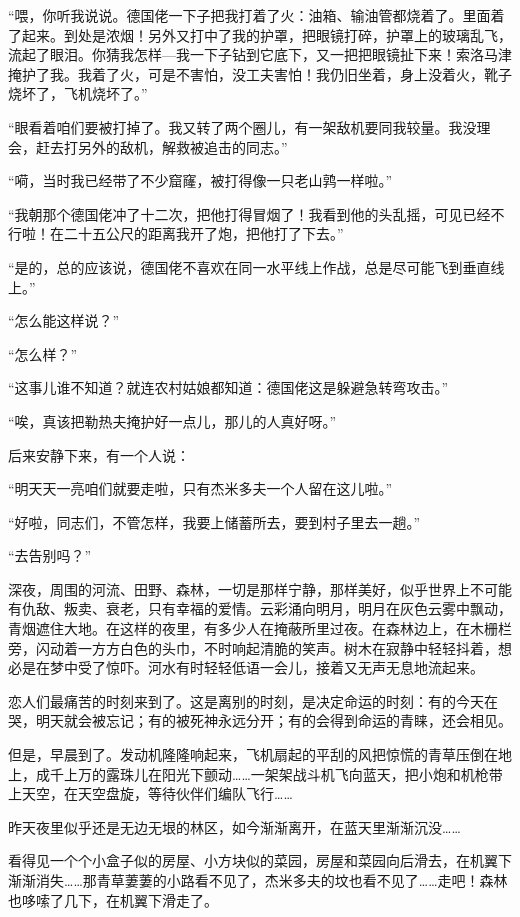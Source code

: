 “喂，你听我说说。德国佬一下子把我打着了火：油箱、输油管都烧着了。里面着了起来。到处是浓烟！另外又打中了我的护罩，把眼镜打碎，护罩上的玻璃乱飞，流起了眼泪。你猜我怎样—我一下子钻到它底下，又一把把眼镜扯下来！索洛马津掩护了我。我着了火，可是不害怕，没工夫害怕！我仍旧坐着，身上没着火，靴子烧坏了，飞机烧坏了。”

“眼看着咱们要被打掉了。我又转了两个圈儿，有一架敌机要同我较量。我没理会，赶去打另外的敌机，解救被追击的同志。”

“嗬，当时我已经带了不少窟窿，被打得像一只老山鹑一样啦。”

“我朝那个德国佬冲了十二次，把他打得冒烟了！我看到他的头乱摇，可见已经不行啦！在二十五公尺的距离我开了炮，把他打了下去。”

“是的，总的应该说，德国佬不喜欢在同一水平线上作战，总是尽可能飞到垂直线上。”

“怎么能这样说？”

“怎么样？”

“这事儿谁不知道？就连农村姑娘都知道：德国佬这是躲避急转弯攻击。”

“唉，真该把勒热夫掩护好一点儿，那儿的人真好呀。”

后来安静下来，有一个人说：

“明天天一亮咱们就要走啦，只有杰米多夫一个人留在这儿啦。”

“好啦，同志们，不管怎样，我要上储蓄所去，要到村子里去一趟。”

“去告别吗？”

深夜，周围的河流、田野、森林，一切是那样宁静，那样美好，似乎世界上不可能有仇敌、叛卖、衰老，只有幸福的爱情。云彩涌向明月，明月在灰色云雾中飘动，青烟遮住大地。在这样的夜里，有多少人在掩蔽所里过夜。在森林边上，在木栅栏旁，闪动着一方方白色的头巾，不时响起清脆的笑声。树木在寂静中轻轻抖着，想必是在梦中受了惊吓。河水有时轻轻低语一会儿，接着又无声无息地流起来。

恋人们最痛苦的时刻来到了。这是离别的时刻，是决定命运的时刻：有的今天在哭，明天就会被忘记；有的被死神永远分开；有的会得到命运的青睐，还会相见。

但是，早晨到了。发动机隆隆响起来，飞机扇起的平刮的风把惊慌的青草压倒在地上，成千上万的露珠儿在阳光下颤动……一架架战斗机飞向蓝天，把小炮和机枪带上天空，在天空盘旋，等待伙伴们编队飞行……

昨天夜里似乎还是无边无垠的林区，如今渐渐离开，在蓝天里渐渐沉没……

看得见一个个小盒子似的房屋、小方块似的菜园，房屋和菜园向后滑去，在机翼下渐渐消失……那青草萋萋的小路看不见了，杰米多夫的坟也看不见了……走吧！森林也哆嗦了几下，在机翼下滑走了。

